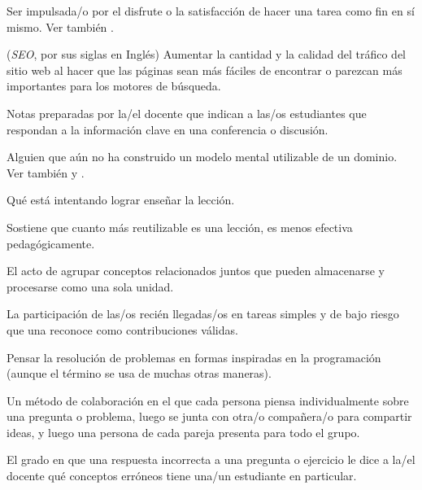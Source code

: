 \begin{description}
 Ser impulsada/o por el disfrute o
la satisfacción de hacer una tarea como fin en sí mismo.  Ver también
.

 (\emph{SEO}, por sus siglas en Inglés)  Aumentar la cantidad y la calidad del tráfico del sitio web al hacer que las páginas sean más fáciles de encontrar o parezcan más importantes para los motores de búsqueda.

 Notas preparadas por la/el docente que indican a las/os estudiantes que respondan a la información clave en una conferencia o discusión.

 Alguien que aún no ha construido un modelo mental utilizable de un dominio. Ver también  y .

 Qué está intentando lograr enseñar la lección.

 Sostiene que cuanto más reutilizable es una lección, es menos efectiva pedagógicamente.

 El acto de agrupar conceptos relacionados juntos
que pueden almacenarse y procesarse como una sola unidad.

 La participación de las/os recién llegadas/os en tareas simples y de bajo riesgo que una  
 reconoce como contribuciones válidas.

 Pensar la
resolución de problemas en formas inspiradas en la programación (aunque el término se usa de muchas otras maneras).

 Un método de colaboración
en el que cada persona piensa individualmente sobre una pregunta o problema,
luego se junta con otra/o compañera/o para compartir ideas, y luego una persona de
cada pareja presenta para todo el grupo.

 El grado en que una respuesta incorrecta
a una pregunta o ejercicio le dice a la/el docente qué conceptos erróneos tiene una/un estudiante en particular.


\end{description}
